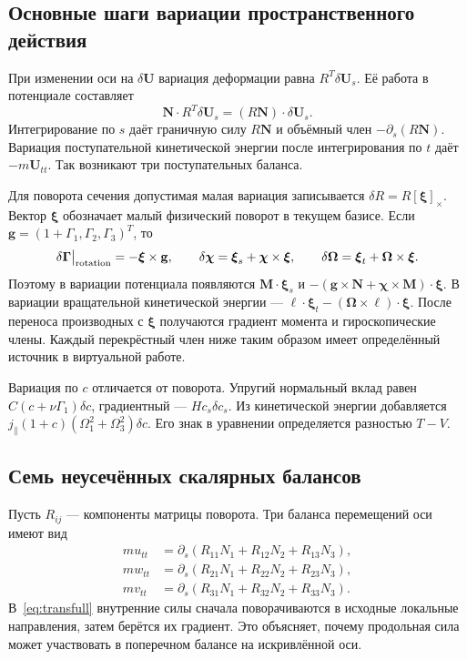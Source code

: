\documentclass[11pt,a4paper]{article}
\newcommand{\Gam}{\boldsymbol\Gamma}
\newcommand{\Om}{\boldsymbol\Omega}
\newcommand{\Chi}{\boldsymbol\chi}
\begin{document}
\subsection{Основные шаги вариации пространственного действия}
При изменении оси на $\delta\mathbf U$ вариация деформации равна $R^T\delta\mathbf U_s$. Её работа в потенциале составляет
\[
\mathbf N\cdot R^T\delta\mathbf U_s
=(R\mathbf N)\cdot\delta\mathbf U_s.
\]
Интегрирование по $s$ даёт граничную силу $R\mathbf N$ и объёмный член $-\partial_s(R\mathbf N)$. Вариация поступательной кинетической энергии после интегрирования по $t$ даёт $-m\mathbf U_{tt}$. Так возникают три поступательных баланса.

Для поворота сечения допустимая малая вариация записывается $\delta R=R[\boldsymbol\xi]_\times$. Вектор $\boldsymbol\xi$ обозначает малый физический поворот в текущем базисе. Если $\mathbf g=(1+\Gamma_1,\Gamma_2,\Gamma_3)^T$, то
\[
\delta\Gam\big|_{\rm rotation}=-\boldsymbol\xi\times\mathbf g,
\qquad \delta\Chi=\boldsymbol\xi_s+\Chi\times\boldsymbol\xi,
\qquad \delta\Om=\boldsymbol\xi_t+\Om\times\boldsymbol\xi.
\]
Поэтому в вариации потенциала появляются $\mathbf M\cdot\boldsymbol\xi_s$ и
$-(\mathbf g\times\mathbf N+\Chi\times\mathbf M)\cdot\boldsymbol\xi$.
В вариации вращательной кинетической энергии ---
$\boldsymbol\ell\cdot\boldsymbol\xi_t-(\Om\times\boldsymbol\ell)\cdot\boldsymbol\xi$.
После переноса производных с $\boldsymbol\xi$ получаются градиент момента и гироскопические члены. Каждый перекрёстный член ниже таким образом имеет определённый источник в виртуальной работе.

Вариация по $c$ отличается от поворота. Упругий нормальный вклад равен $C(c+\nu\Gamma_1)\delta c$, градиентный --- $Hc_s\delta c_s$. Из кинетической энергии добавляется $j_\parallel(1+c)(\Omega_1^2+\Omega_3^2)\delta c$. Его знак в уравнении определяется разностью $T-V$.

\subsection{Семь неусечённых скалярных балансов}
Пусть $R_{ij}$ --- компоненты матрицы поворота. Три баланса перемещений оси имеют вид
\begin{equation}
\begin{aligned}
mu_{tt}&=\partial_s(R_{11}N_1+R_{12}N_2+R_{13}N_3),\\
mw_{tt}&=\partial_s(R_{21}N_1+R_{22}N_2+R_{23}N_3),\\
mv_{tt}&=\partial_s(R_{31}N_1+R_{32}N_2+R_{33}N_3).
\end{aligned}
\label{eq:transfull}
\end{equation}
В~\eqref{eq:transfull} внутренние силы сначала поворачиваются в исходные локальные направления, затем берётся их градиент. Это объясняет, почему продольная сила может участвовать в поперечном балансе на искривлённой оси.
\end{document}
